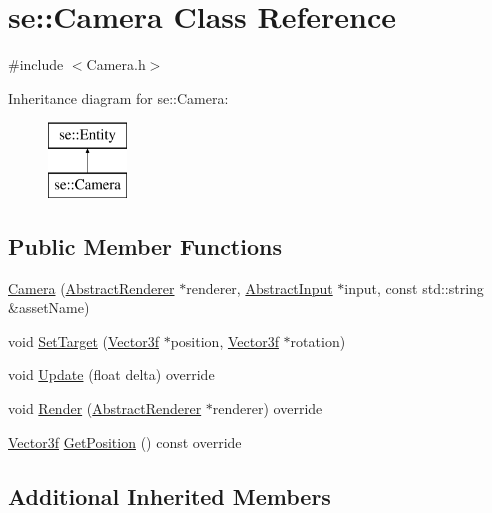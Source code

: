 \hypertarget{classse_1_1_camera}{}\section{se\+:\+:Camera Class Reference}
\label{classse_1_1_camera}


{\ttfamily \#include $<$Camera.\+h$>$}

Inheritance diagram for se\+:\+:Camera\+:\begin{figure}[H]
\begin{center}
\leavevmode
\includegraphics[height=2.000000cm]{classse_1_1_camera}
\end{center}
\end{figure}
\subsection*{Public Member Functions}
\begin{DoxyCompactItemize}
\item 
\mbox{\hyperlink{classse_1_1_camera_a45cc397abfbd7287d96dbbb70330f2e5}{Camera}} (\mbox{\hyperlink{classse_1_1_abstract_renderer}{Abstract\+Renderer}} $\ast$renderer, \mbox{\hyperlink{classse_1_1_abstract_input}{Abstract\+Input}} $\ast$input, const std\+::string \&asset\+Name)
\item 
void \mbox{\hyperlink{classse_1_1_camera_ac49219007d931e1800a33d2603f08856}{Set\+Target}} (\mbox{\hyperlink{namespacese_a12e07512d95e2fdebdaf74a5ea2cf5f6}{Vector3f}} $\ast$position, \mbox{\hyperlink{namespacese_a12e07512d95e2fdebdaf74a5ea2cf5f6}{Vector3f}} $\ast$rotation)
\item 
void \mbox{\hyperlink{classse_1_1_camera_abecf2d50dc793707a475b35bb487812c}{Update}} (float delta) override
\item 
void \mbox{\hyperlink{classse_1_1_camera_accc1f78d52fca1e68c5267fbc0fef239}{Render}} (\mbox{\hyperlink{classse_1_1_abstract_renderer}{Abstract\+Renderer}} $\ast$renderer) override
\item 
\mbox{\hyperlink{namespacese_a12e07512d95e2fdebdaf74a5ea2cf5f6}{Vector3f}} \mbox{\hyperlink{classse_1_1_camera_af3d7f8a74dc26a3840331ab40b6ac893}{Get\+Position}} () const override
\end{DoxyCompactItemize}
\subsection*{Additional Inherited Members}


